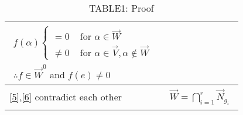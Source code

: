 \documentclass[journal,12pt,twocolumn]{IEEEtran}
\begin{document}
\begin{table*}[!t]
\begin{tabular}{|l|l|}
{       \begin{align}
         f(\alpha)
         \begin{cases}
         = 0 & \text{ for }     \alpha \in \vec{W}\\
         \neq 0 & \text{ for } \alpha \in \vec{V},\alpha \notin \vec{W}
       \end{cases}\\
        \therefore f \in \vec{W}^0 \text{ and } f(e) \neq 0  \label{6}
       \end{align}}\\
       \hline
       \eqref{5},\eqref{6} contradict each other & 
       \parbox{10cm}{\begin{align}
          \vec{W}=\bigcap_{i=1}^r \vec{N}_{g_i}
       \end{align}}\\
       \hline
    \end{tabular}
    \caption*{TABLE1: Proof}
\end{table*}
\end{document}
